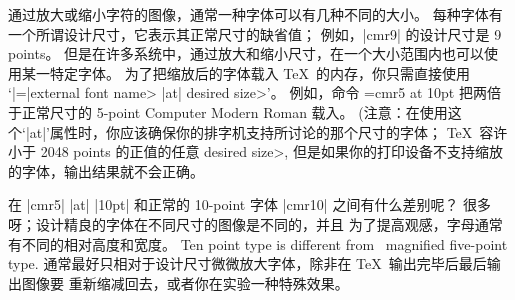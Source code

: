 \danger 通过放大或缩小字符的图像，通常一种字体可以有几种不同的大小。%
每种字体有一个所谓设计尺寸，它表示其正常尺寸的缺省值；
例如，|cmr9| 的设计尺寸是 9 points。%
但是在许多系统中，通过放大和缩小尺寸，在一个大小范围内也可以使用某一特定字体。%
为了把缩放后的字体载入 \TeX\ 的内存，你只需直接使用%
`|\font\cs=|\<external font name> |at| \<desired size>'。%
例如，命令
\begintt
\font\magnifiedfiverm=cmr5 at 10pt
\endtt
把两倍于正常尺寸的 5-point Computer Modern Roman 载入。%
(注意：在使用这个`|at|'属性时，你应该确保你的排字机支持所讨论的那个尺寸的字体；
\TeX\ 容许小于 2048 points 的正值的任意 \<desired size>,
但是如果你的打印设备不支持缩放的字体，输出结果就不会正确。

\danger 在 |cmr5| |at| |10pt| 和正常的 10-point 字体 |cmr10| 之间有什么差别呢？
很多呀；设计精良的字体在不同尺寸的图像是不同的，并且%
为了提高观感，字母通常有不同的相对高度和宽度。
\begindisplay
\tenrm Ten point type is different from%
  \magnifiedfiverm\ magnif{}ied f{}ive-point type.
\enddisplay
通常最好只相对于设计尺寸微微放大字体，除非在 \TeX\ 输出完毕后最后输出图像要%
重新缩减回去，或者你在实验一种特殊效果。

